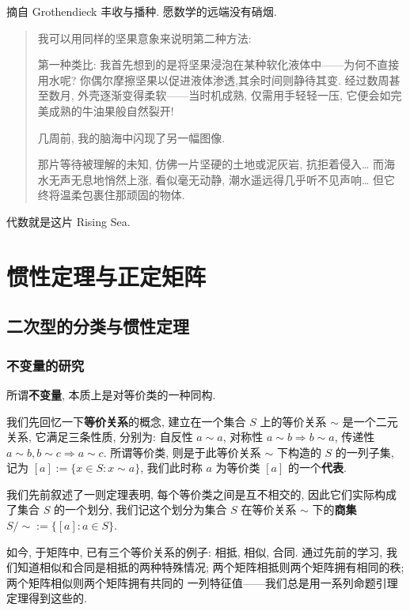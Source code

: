 \documentclass[UTF8]{book}
\begin{document}
\vspace*{5em}

摘自 Grothendieck 丰收与播种. 愿数学的远端没有硝烟. 

\begin{quotation}
    
    \kaishu   
    我可以用同样的坚果意象来说明第二种方法: 
    
    第一种类比: 
    我首先想到的是将坚果浸泡在某种软化液体中——为何不直接用水呢? 
    你偶尔摩擦坚果以促进液体渗透,其余时间则静待其变. 
    经过数周甚至数月, 外壳逐渐变得柔软——当时机成熟, 仅需用手轻轻一压, 
    它便会如完美成熟的牛油果般自然裂开! 

    几周前, 我的脑海中闪现了另一幅图像. 
      
    那片等待被理解的未知, 仿佛一片坚硬的土地或泥灰岩, 抗拒着侵入\dots
    而海水无声无息地悄然上涨, 看似毫无动静, 潮水遥远得几乎听不见声响\dots 
    但它终将温柔包裹住那顽固的物体. 
    
\end{quotation}

代数就是这片 Rising Sea. 

\setcounter{chapter}{3}
\chapter{惯性定理与正定矩阵}

\section{二次型的分类与惯性定理}
\subsection{不变量的研究}

所谓\textbf{不变量}, 本质上是对等价类的一种同构. 

我们先回忆一下\textbf{等价关系}的概念, 
建立在一个集合 $S$ 上的等价关系 $\sim$ 是一个二元关系, 
它满足三条性质, 分别为: 自反性 $a\sim a$, 对称性
 $a\sim b \Rightarrow b\sim a$, 
传递性 $a\sim b, b\sim c \Rightarrow a \sim c$. 
所谓等价类, 则是于此等价关系 $\sim$ 下构造的 $S$ 的一列子集, 
记为 $[a] :=\{x \in S: x\sim a\}$, 我们此时称 $a$ 为等价类 $[a]$ 
的一个\textbf{代表}. 

我们先前叙述了一则定理表明, 每个等价类之间是互不相交的, 
因此它们实际构成了集合 $S$ 的一个划分, 我们记这个划分为集合 $S$ 在等价关系 
$\sim$ 下的\textbf{商集} $ S/\sim := \{[a]:a\in S\} $. 

如今, 于矩阵中, 已有三个等价关系的例子: 相抵, 相似, 合同. 
通过先前的学习, 我们知道相似和合同是相抵的两种特殊情况; 
两个矩阵相抵则两个矩阵拥有相同的秩; 两个矩阵相似则两个矩阵拥有共同的
一列特征值——我们总是用一系列命题引理定理得到这些的. 
\end{document}
